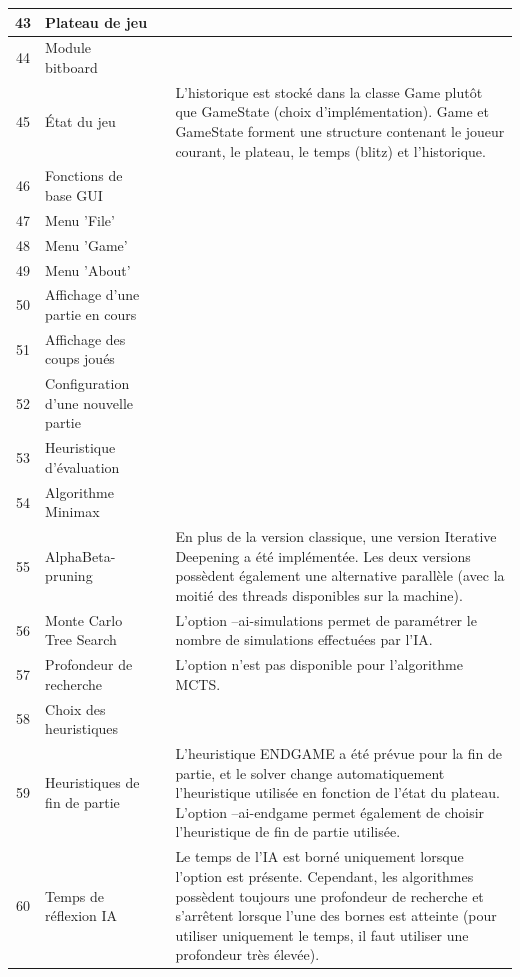 \documentclass{article}
\newcommand{\valid}{\textcolor{green}{\ding{108}}}  %
\begin{document}
\begin{longtable}{|c|p{5cm}|c|p{5cm}|}
    \hline
    43 & Plateau de jeu & \valid & \\
    \hline
    44 & Module bitboard & \valid & \\
    \hline
    45 & État du jeu & \valid & L'historique est stocké dans la classe Game plutôt que GameState (choix d'implémentation).
    Game et GameState forment une structure contenant le joueur courant, le plateau, le temps (blitz) et l'historique.\\
    \hline
    46 & Fonctions de base GUI & \valid & \\
    \hline
    47 & Menu 'File' & \valid & \\
    \hline
    48 & Menu 'Game' & \valid & \\
    \hline
    49 & Menu 'About' & \valid & \\
    \hline
    50 & Affichage d'une partie en cours & \valid & \\
    \hline
    51 & Affichage des coups joués & \valid & \\
    \hline
    52 & Configuration d'une nouvelle partie & \valid & \\
    \hline
    53 & Heuristique d'évaluation & \valid & \\
    \hline
    54 & Algorithme Minimax & \valid & \\
    \hline
    55 & AlphaBeta-pruning & \valid & En plus de la version classique, une version Iterative Deepening a été implémentée. Les deux versions possèdent également une alternative parallèle (avec la moitié des threads disponibles sur la machine). \\
    \hline
    56 & Monte Carlo Tree Search & \valid & L'option --ai-simulations permet de paramétrer le nombre de simulations effectuées par l'IA. \\
    \hline
    57 & Profondeur de recherche & \valid & L'option n'est pas disponible pour l'algorithme MCTS. \\
    \hline
    58 & Choix des heuristiques & \valid & \\
    \hline
    59 & Heuristiques de fin de partie & \valid & L'heuristique ENDGAME a été prévue pour la fin de partie, et le solver change automatiquement l'heuristique utilisée en fonction de l'état du plateau. L'option --ai-endgame permet également de choisir l'heuristique de fin de partie utilisée. \\
    \hline
    60 & Temps de réflexion IA & \valid & Le temps de l'IA est borné uniquement lorsque l'option est présente. Cependant, les algorithmes possèdent toujours une profondeur de recherche et s'arrêtent lorsque l'une des bornes est atteinte (pour utiliser uniquement le temps, il faut utiliser une profondeur très élevée). \\
    \hline
\end{longtable}
\end{document}
